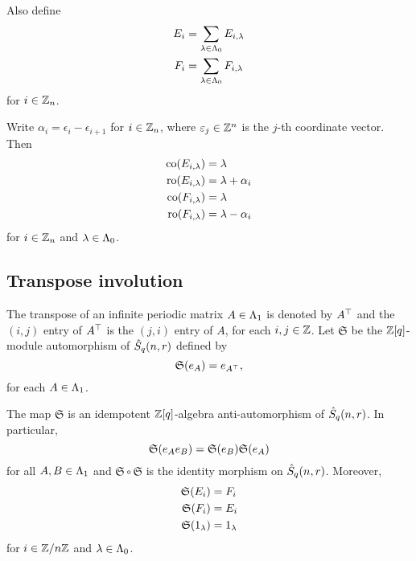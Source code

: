 \documentclass[a4paper, 11pt, twoside]{report}
\begin{document}
Also define
\begin{align*}
E_i &= \sum_{\lambda\in\Lambda_0{}} E_{i,\lambda}\\
F_i &= \sum_{\lambda\in\Lambda_0{}} F_{i,\lambda}
\end{align*}
for $i\in\mathbb{Z}_n$.

Write $\alpha_i=\epsilon_i - \epsilon_{i+1}$ for $i\in\mathbb{Z}_n$, where $\varepsilon_j\in\mathbb{Z}^n$ is the $j$-th coordinate vector. Then
\begin{align*}
\operatorname{co}(E_{i,\lambda}) &= \lambda\\
\operatorname{ro}(E_{i,\lambda}) &= \lambda +\alpha_i\\
\operatorname{co}(F_{i,\lambda}) &= \lambda\\
\operatorname{ro}(F_{i,\lambda}) &= \lambda - \alpha_i
\end{align*}
for $i\in\mathbb{Z}_n$ and $\lambda\in\Lambda_0{}$.


\subsection{Transpose involution}

The transpose of an infinite periodic matrix $A\in\Lambda_1{}$ is denoted by $A^\top$ and the $(i,j)$ entry of $A^\top$ is the $(j,i)$ entry of $A$, for each $i,j\in\mathbb{Z}$. Let $\mathfrak{S}$ be the $\mathbb{Z}[q]$-module automorphism of $\hat{S}_q(n,r)$ defined by
\begin{equation*}
\mathfrak{S}{(e_A)} = e_{A^\top},
\end{equation*}
for each $A\in\Lambda_1{}$.

\begin{lemma}\label{lemma:transpose-involution}
The map $\mathfrak{S}$ is an idempotent $\mathbb{Z}[q]$-algebra anti-automorphism of $\hat{S}_q(n,r)$. In particular,
\begin{equation*}
\mathfrak{S}{(e_Ae_B)}=\mathfrak{S}{(e_B)}\mathfrak{S}{(e_A)}
\end{equation*}
for all $A,B\in\Lambda_1{}$ and $\mathfrak{S}\circ \mathfrak{S}$ is the identity morphism on $\hat{S}_q(n,r)$. Moreover,
\begin{align*}
\mathfrak{S}{(E_i)} &= F_i\\
\mathfrak{S}{(F_i)} &= E_i\\
\mathfrak{S}{(1_\lambda)} &= 1_\lambda
\end{align*}
for $i\in\mathbb{Z}/{n \mathbb{Z}}$ and $\lambda\in\Lambda_0{}$.
\end{lemma}
\end{document}

